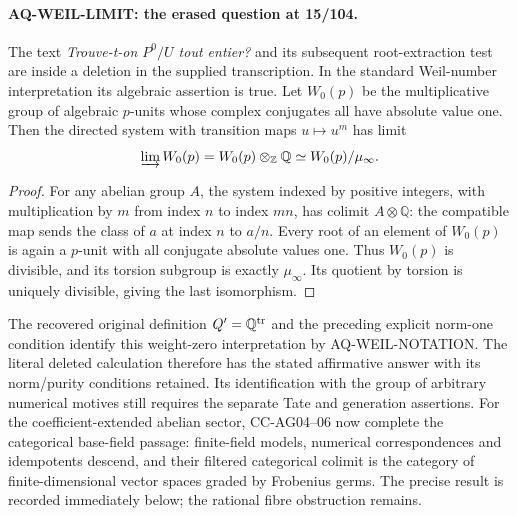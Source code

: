 \paragraph{AQ-WEIL-LIMIT: the erased question at 15/104.}
The text \emph{Trouve-t-on $P^0/U$ tout entier?}
and its subsequent root-extraction test are inside a
deletion in the supplied transcription. In the standard
Weil-number interpretation its algebraic assertion is true.
Let $W_0(p)$ be the multiplicative group of algebraic
$p$-units whose complex conjugates all have absolute
value one. Then the directed system with transition
maps $u\mapsto u^m$ has limit
\[
 \varinjlim W_0(p)=W_0(p)\otimes_{\mathbb Z}\mathbb Q
                 \simeq W_0(p)/\mu_\infty .
\]
\begin{proof}
For any abelian group $A$, the system indexed by
positive integers, with multiplication by $m$ from
index $n$ to index $mn$, has colimit
$A\otimes\mathbb Q$: the compatible map sends
the class of $a$ at index $n$ to $a/n$.
Every root of an element of $W_0(p)$ is again
a $p$-unit with all conjugate absolute values one.
Thus $W_0(p)$ is divisible, and its torsion subgroup
is exactly $\mu_\infty$. Its quotient by torsion
is uniquely divisible, giving the last isomorphism.
\end{proof}
The recovered original definition $Q'=\mathbb Q^{\rm tr}$
and the preceding explicit norm-one condition identify
this weight-zero interpretation by AQ-WEIL-NOTATION.
The literal deleted calculation therefore has the stated
affirmative answer with its norm/purity conditions retained.
Its identification with the group of arbitrary numerical motives
still requires the separate Tate and generation assertions.
For the coefficient-extended abelian sector, CC-AG04--06 now
complete the categorical base-field passage: finite-field models,
numerical correspondences and idempotents descend, and their
filtered categorical colimit is the category of finite-dimensional
vector spaces graded by Frobenius germs. The precise result is
recorded immediately below; the rational fibre obstruction remains.

